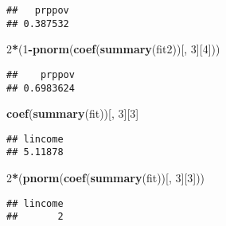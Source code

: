 \documentclass[
]{article}
\newenvironment{Shaded}{\begin{snugshade}}{\end{snugshade}}
\newcommand{\DataTypeTok}[1]{\textcolor[rgb]{0.13,0.29,0.53}{#1}}
\newcommand{\DecValTok}[1]{\textcolor[rgb]{0.00,0.00,0.81}{#1}}
\newcommand{\KeywordTok}[1]{\textcolor[rgb]{0.13,0.29,0.53}{\textbf{#1}}}
\newcommand{\NormalTok}[1]{#1}
\newcommand{\OperatorTok}[1]{\textcolor[rgb]{0.81,0.36,0.00}{\textbf{#1}}}
\begin{document}
\begin{verbatim}
##   prppov 
## 0.387532
\end{verbatim}

\begin{Shaded}
\begin{Highlighting}[]
\DecValTok{2}\OperatorTok{*}\NormalTok{(}\DecValTok{1}\OperatorTok{-}\KeywordTok{pnorm}\NormalTok{(}\KeywordTok{coef}\NormalTok{(}\KeywordTok{summary}\NormalTok{(fit2))[, }\DecValTok{3}\NormalTok{][}\DecValTok{4}\NormalTok{]))}
\end{Highlighting}
\end{Shaded}

\begin{verbatim}
##    prppov 
## 0.6983624
\end{verbatim}

\begin{Shaded}
\begin{Highlighting}[]
\KeywordTok{coef}\NormalTok{(}\KeywordTok{summary}\NormalTok{(fit))[, }\DecValTok{3}\NormalTok{][}\DecValTok{3}\NormalTok{]}
\end{Highlighting}
\end{Shaded}

\begin{verbatim}
## lincome 
## 5.11878
\end{verbatim}

\begin{Shaded}
\begin{Highlighting}[]
\DecValTok{2}\OperatorTok{*}\NormalTok{(}\KeywordTok{pnorm}\NormalTok{(}\KeywordTok{coef}\NormalTok{(}\KeywordTok{summary}\NormalTok{(fit))[, }\DecValTok{3}\NormalTok{][}\DecValTok{3}\NormalTok{]))}
\end{Highlighting}
\end{Shaded}

\begin{verbatim}
## lincome 
##       2
\end{verbatim}

\begin{Shaded}
\end{Shaded}
\end{document}
